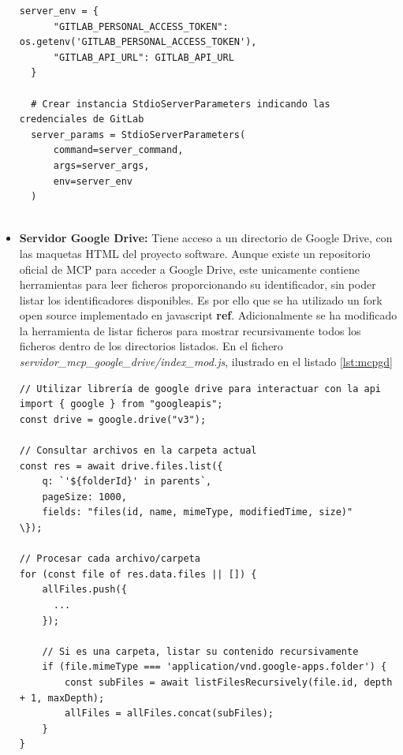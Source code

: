 \begin{itemize}
\begin{lstlisting}[caption={Instanciado de StdioServerParameters para el servidor MCP de GitLab},label={lst:mcpgitlab}]
  server_env = {
      "GITLAB_PERSONAL_ACCESS_TOKEN": os.getenv('GITLAB_PERSONAL_ACCESS_TOKEN'),
      "GITLAB_API_URL": GITLAB_API_URL
  }

  # Crear instancia StdioServerParameters indicando las credenciales de GitLab
  server_params = StdioServerParameters(
      command=server_command,
      args=server_args,
      env=server_env
  )
  
\end{lstlisting}

\item\textbf{Servidor Google Drive: }Tiene acceso a un directorio de Google Drive, con las maquetas HTML del proyecto software. Aunque existe un repositorio oficial de MCP para acceder a Google Drive, este unicamente contiene herramientas para leer ficheros proporcionando su identificador, sin poder listar los identificadores disponibles. Es por ello que se ha utilizado un fork open source implementado en javascript \textbf{ref}. Adicionalmente se ha modificado la herramienta de listar ficheros para mostrar recursivamente todos los ficheros dentro de los directorios listados. En el fichero \textit{servidor\_mcp\_google\_drive/index\_mod.js}, ilustrado en el listado \ref{lst:mcpgd}


\begin{lstlisting}[caption={Implementación de herramienta gdrive\_list\_files utilizando la API de Google Drive},label={lst:mcpgd}]
// Utilizar librería de google drive para interactuar con la api
import { google } from "googleapis";
const drive = google.drive("v3"); 

// Consultar archivos en la carpeta actual
const res = await drive.files.list({
    q: `'${folderId}' in parents`,
    pageSize: 1000,
    fields: "files(id, name, mimeType, modifiedTime, size)"
\});

// Procesar cada archivo/carpeta
for (const file of res.data.files || []) {
    allFiles.push({
      ...
    });
    
    // Si es una carpeta, listar su contenido recursivamente
    if (file.mimeType === 'application/vnd.google-apps.folder') {
        const subFiles = await listFilesRecursively(file.id, depth + 1, maxDepth);
        allFiles = allFiles.concat(subFiles);
    }
}

\end{lstlisting}


\end{itemize}
